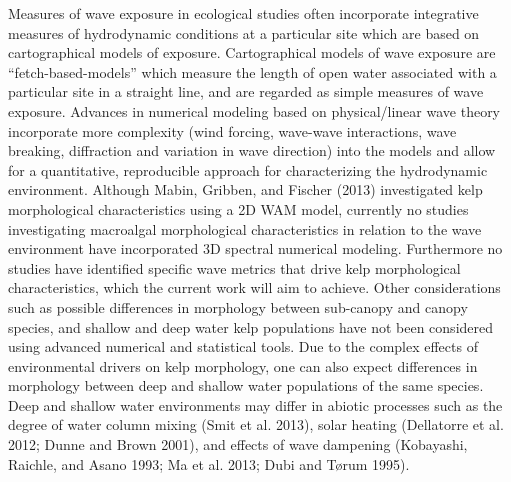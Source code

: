 \documentclass[
  a4paper,
]{article}
\begin{document}
Measures of wave exposure in ecological studies often incorporate
integrative measures of hydrodynamic conditions at a particular site
which are based on cartographical models of exposure. Cartographical
models of wave exposure are ``fetch-based-models'' which measure the
length of open water associated with a particular site in a straight
line, and are regarded as simple measures of wave exposure. Advances in
numerical modeling based on physical/linear wave theory incorporate more
complexity (wind forcing, wave-wave interactions, wave breaking,
diffraction and variation in wave direction) into the models and allow
for a quantitative, reproducible approach for characterizing the
hydrodynamic environment. Although Mabin, Gribben, and Fischer (2013)
investigated kelp morphological characteristics using a 2D WAM model,
currently no studies investigating macroalgal morphological
characteristics in relation to the wave environment have incorporated 3D
spectral numerical modeling. Furthermore no studies have identified
specific wave metrics that drive kelp morphological characteristics,
which the current work will aim to achieve. Other considerations such as
possible differences in morphology between sub-canopy and canopy
species, and shallow and deep water kelp populations have not been
considered using advanced numerical and statistical tools. Due to the
complex effects of environmental drivers on kelp morphology, one can
also expect differences in morphology between deep and shallow water
populations of the same species. Deep and shallow water environments may
differ in abiotic processes such as the degree of water column mixing
(Smit et al. 2013), solar heating (Dellatorre et al. 2012; Dunne and
Brown 2001), and effects of wave dampening (Kobayashi, Raichle, and
Asano 1993; Ma et al. 2013; Dubi and Tørum 1995).
\end{document}
